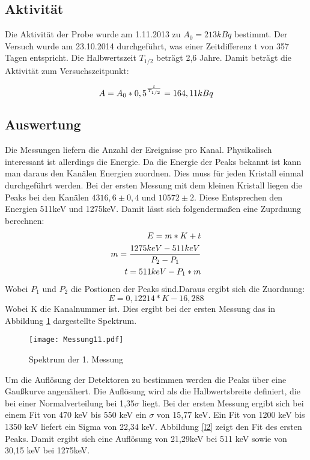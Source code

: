 \documentclass[a4paper,11pt,twoside]{article}
\begin{document}
\subsection{Aktivität}
Die Aktivität der Probe wurde am 1.11.2013 zu $A_0=213 kBq$ bestimmt. Der Versuch wurde am 23.10.2014 durchgeführt, was einer Zeitdifferenz t von 357 Tagen entspricht. Die Halbwertszeit $T_{1/2}$ beträgt 2,6 Jahre. Damit beträgt die Aktivität zum Versuchszeitpunkt:

\begin{equation}
A=A_0*0,5^{t\over T_{1/2}}=164,11 kBq
\end{equation}

\subsection{Auswertung}
Die Messungen liefern die Anzahl der Ereignisse pro Kanal. Physikalisch interessant ist allerdings die Energie. Da die Energie der Peaks bekannt ist kann man daraus den Kanälen Energien zuordnen. Dies muss für jeden Kristall einmal durchgeführt werden. Bei der ersten Messung mit dem kleinen Kristall liegen die Peaks bei den Kanälen $4316,6\pm0,4$ und $10572\pm2$. Diese Entsprechen den Energien 511keV und 1275keV. 
Damit lässt sich folgendermaßen eine Zuprdnung berechnen:
\begin{align}
E=m*K+t\\
m={{1275keV-511keV}\over{P_2-P_1}}\\
t=511keV-P_1*m
\end{align}
Wobei $P_1$ und $P_2$ die Postionen der Peaks sind.Daraus ergibt sich die Zuordnung:
\begin{equation}
E=0,12214*K-16,288
\end{equation}
Wobei K die Kanalnummer ist.
Dies ergibt bei der ersten Messung das in Abbildung \ref{l1} dargestellte Spektrum.
\begin{figure}[htbp]
	\begin{center}
		\texttt{[image: Messung11.pdf]}
		\caption{Spektrum der 1. Messung}
		\label{l1}
	\end{center}
\end{figure}
Um die Auflösung der Detektoren zu bestimmen werden die Peaks über eine Gaußkurve angenähert. Die Auflösung wird als die Halbwertsbreite definiert, die bei einer Normalverteilung bei 1,35$\sigma$ liegt. Bei der ersten Messung ergibt sich bei einem Fit von 470 keV bis 550 keV ein $\sigma$ von 15,77 keV. Ein Fit von 1200 keV bis 1350 keV liefert ein Sigma von 22,34 keV. Abbildung \ref{l2} zeigt den Fit des ersten Peaks. Damit ergibt sich eine Auflösung von 21,29keV bei 511 keV sowie von 30,15 keV bei 1275keV.
\end{document}
